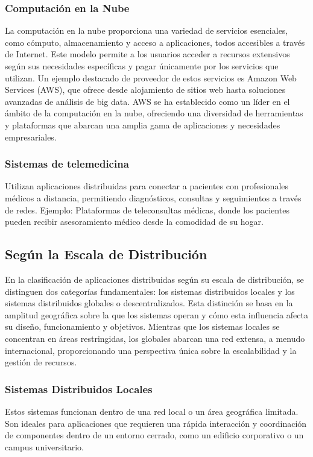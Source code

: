 \subsubsection{Computación en la Nube}
La computación en la nube proporciona una variedad de servicios esenciales, como cómputo, almacenamiento y acceso a aplicaciones, todos accesibles a través de Internet. Este modelo permite a los usuarios acceder a recursos extensivos según sus necesidades específicas y pagar únicamente por los servicios que utilizan. Un ejemplo destacado de proveedor de estos servicios es Amazon Web Services (AWS), que ofrece desde alojamiento de sitios web hasta soluciones avanzadas de análisis de big data. AWS se ha establecido como un líder en el ámbito de la computación en la nube, ofreciendo una diversidad de herramientas y plataformas que abarcan una amplia gama de aplicaciones y necesidades empresariales.

\subsubsection{Sistemas de telemedicina}
Utilizan aplicaciones distribuidas para conectar a pacientes con profesionales médicos a distancia, permitiendo diagnósticos, consultas y seguimientos a través de redes. Ejemplo: Plataformas de teleconsultas médicas, donde los pacientes pueden recibir asesoramiento médico desde la comodidad de su hogar.

\subsection{Según la Escala de Distribución}
En la clasificación de aplicaciones distribuidas según su escala de distribución, se distinguen dos categorías fundamentales: los sistemas distribuidos locales y los sistemas distribuidos globales o descentralizados. Esta distinción se basa en la amplitud geográfica sobre la que los sistemas operan y cómo esta influencia afecta su diseño, funcionamiento y objetivos. Mientras que los sistemas locales se concentran en áreas restringidas, los globales abarcan una red extensa, a menudo internacional, proporcionando una perspectiva única sobre la escalabilidad y la gestión de recursos.

\subsubsection{Sistemas Distribuidos Locales}
Estos sistemas funcionan dentro de una red local o un área geográfica limitada. Son ideales para aplicaciones que requieren una rápida interacción y coordinación de componentes dentro de un entorno cerrado, como un edificio corporativo o un campus universitario.

